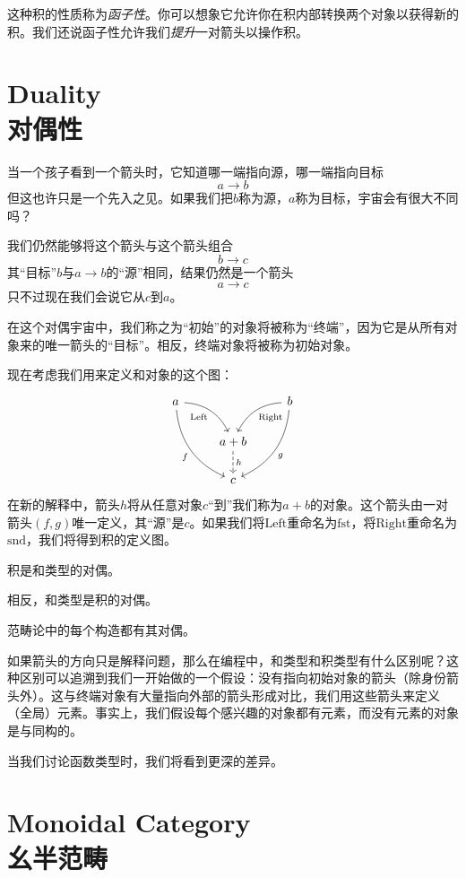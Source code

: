 \documentclass[DaoFP]{subfiles}
\begin{document}
 这种积的性质称为\emph{函子性}。你可以想象它允许你在积内部转换两个对象以获得新的积。我们还说函子性允许我们\emph{提升}一对箭头以操作积。

 \section{Duality\\对偶性}

 当一个孩子看到一个箭头时，它知道哪一端指向源，哪一端指向目标
 \[a \to b \]
 但这也许只是一个先入之见。如果我们把$b$称为源，$a$称为目标，宇宙会有很大不同吗？

 我们仍然能够将这个箭头与这个箭头组合
 \[b \to c\]
 其“目标”$b$与$a \to b$的“源”相同，结果仍然是一个箭头
 \[a \to c\]
 只不过现在我们会说它从$c$到$a$。

 在这个对偶宇宙中，我们称之为“初始”的对象将被称为“终端”，因为它是从所有对象来的唯一箭头的“目标”。相反，终端对象将被称为初始对象。

 现在考虑我们用来定义和对象的这个图：
 \[
  \begin{tikzcd}
   a
   \arrow[dr,  bend left, "\text{Left}"']
   \arrow[ddr, bend right, "f"']
   && b
   \arrow[dl, bend right, "\text{Right}"]
   \arrow[ddl, bend left, "g"]
   \\
   &a + b
   \arrow[d, dashed, "h"]
   \\
   & c
  \end{tikzcd}
 \]
 在新的解释中，箭头$h$将从任意对象$c$“到”我们称为$a + b$的对象。这个箭头由一对箭头$(f, g)$唯一定义，其“源”是$c$。如果我们将$\text{Left}$重命名为$\text{fst}$，将$\text{Right}$重命名为$\text{snd}$，我们将得到积的定义图。

 积是和类型的对偶。

 相反，和类型是积的对偶。

 \medskip

 范畴论中的每个构造都有其对偶。

 \medskip

 如果箭头的方向只是解释问题，那么在编程中，和类型和积类型有什么区别呢？这种区别可以追溯到我们一开始做的一个假设：没有指向初始对象的箭头（除身份箭头外）。这与终端对象有大量指向外部的箭头形成对比，我们用这些箭头来定义（全局）元素。事实上，我们假设每个感兴趣的对象都有元素，而没有元素的对象是与同构的。

 当我们讨论函数类型时，我们将看到更深的差异。

 \section{Monoidal Category\\幺半范畴}
\end{document}
